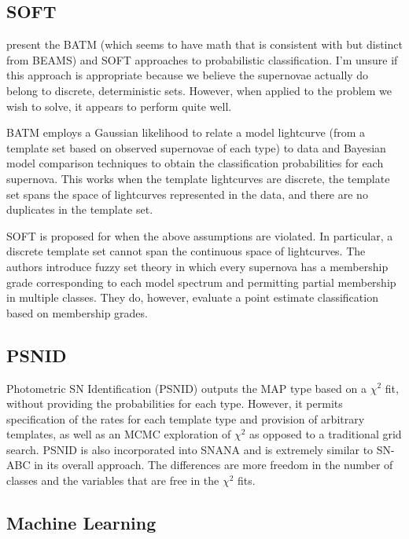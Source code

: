 \documentclass[12pt, onecolumn]{emulateapj}
\begin{document}
\subsection{SOFT}

\citet{Rodney09, Rodney10} present the BATM (which seems to have math that is consistent with but distinct from BEAMS) and SOFT approaches to probabilistic classification.  I'm unsure if this approach is appropriate because we believe the supernovae actually do belong to discrete, deterministic sets.  However, when applied to the problem we wish to solve, it appears to perform quite well.

BATM employs a Gaussian likelihood to relate a model lightcurve (from a template set based on observed supernovae of each type) to data and Bayesian model comparison techniques to obtain the classification probabilities for each supernova.  This works when the template lightcurves are discrete, the template set spans the space of lightcurves represented in the data, and there are no duplicates in the template set.  

SOFT is proposed for when the above assumptions are violated.  In particular, a discrete template set cannot span the continuous space of lightcurves.  The authors introduce fuzzy set theory in which every supernova has a membership grade corresponding to each model spectrum and permitting partial membership in multiple classes.  They do, however, evaluate a point estimate classification based on membership grades.

\subsection{PSNID}

Photometric SN Identification (PSNID) \citep{Sako11} outputs the MAP type based on a $\chi^{2}$ fit, without providing the probabilities for each type.  However, it permits specification of the rates for each template type and provision of arbitrary templates, as well as an MCMC exploration of $\chi^{2}$ as opposed to a traditional grid search.  PSNID is also incorporated into SNANA and is extremely similar to SN-ABC in its overall approach.  The differences are more freedom in the number of classes and the variables that are free in the $\chi^{2}$ fits.

\subsection{Machine Learning}
\end{document}
